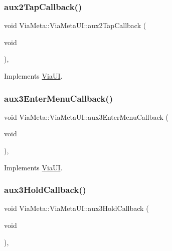 \subsubsection{\texorpdfstring{aux2\+Tap\+Callback()}{aux2TapCallback()}}
{\footnotesize\ttfamily void Via\+Meta\+::\+Via\+Meta\+U\+I\+::aux2\+Tap\+Callback (\begin{DoxyParamCaption}\item[{void}]{ }\end{DoxyParamCaption})\hspace{0.3cm}{\ttfamily [override]}, {\ttfamily [virtual]}}



Implements \mbox{\hyperlink{class_via_u_i_ae5e009dc22002f62e6bff8dd76d2f745}{Via\+UI}}.

\mbox{\label{class_via_meta_1_1_via_meta_u_i_a31f9a7e08ee2d77d7aa96b644369e92d}} 
\subsubsection{\texorpdfstring{aux3\+Enter\+Menu\+Callback()}{aux3EnterMenuCallback()}}
{\footnotesize\ttfamily void Via\+Meta\+::\+Via\+Meta\+U\+I\+::aux3\+Enter\+Menu\+Callback (\begin{DoxyParamCaption}\item[{void}]{ }\end{DoxyParamCaption})\hspace{0.3cm}{\ttfamily [override]}, {\ttfamily [virtual]}}



Implements \mbox{\hyperlink{class_via_u_i_aa62c9f8dc58d37fc2a3abc7bce1cd16e}{Via\+UI}}.

\mbox{\label{class_via_meta_1_1_via_meta_u_i_ad15168253fc76c7a938ca467ada12ade}} 
\subsubsection{\texorpdfstring{aux3\+Hold\+Callback()}{aux3HoldCallback()}}
{\footnotesize\ttfamily void Via\+Meta\+::\+Via\+Meta\+U\+I\+::aux3\+Hold\+Callback (\begin{DoxyParamCaption}\item[{void}]{ }\end{DoxyParamCaption})\hspace{0.3cm}{\ttfamily [override]}, {\ttfamily [virtual]}}



